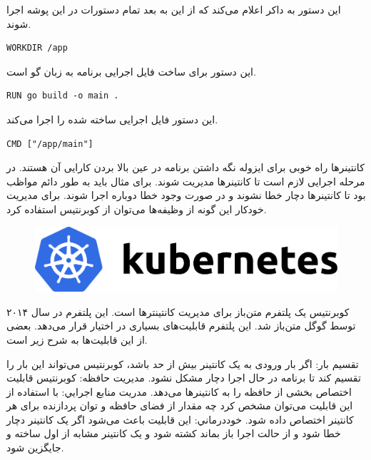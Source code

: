 \documentclass[a4]{report}
\begin{document}
این دستور به داکر اعلام می‌کند که از این به بعد تمام دستورات در این پوشه اجرا شوند.

\begin{latin}
\begin{verbatim}
WORKDIR /app
\end{verbatim}
\end{latin}

این دستور برای ساخت فایل اجرایی برنامه به زبان گو است.

\begin{latin}
\begin{verbatim}
RUN go build -o main .
\end{verbatim}
\end{latin}

این دستور فایل اجرایی ساخته شده را اجرا می‌کند.

\begin{latin}
\begin{verbatim}
CMD ["/app/main"]
\end{verbatim}
\end{latin}


کانتینرها راه خوبی برای ایزوله نگه داشتن برنامه در عین بالا بردن کارایی آن هستند. در مرحله اجرایی لازم است تا
کانتینر‌ها مدیریت شوند. برای مثال باید به طور دائم مواظب بود تا کانتینرها دچار خطا نشوند و در صورت وجود
خطا دوباره اجرا شوند. برای مدیریت خودکار این گونه از وظیفه‌ها می‌توان از کوبرنتیس استفاده کرد.

\begin{figure}
  \centering
  \includegraphics[scale=0.5]{fig/kubernetes}
\end{figure}

کوبرنتیس یک پلتفرم متن‌باز برای مدیریت کانتینتر‌ها است. این پلتفرم در سال ۲۰۱۴ توسط گوگل متن‌باز
شد. این پلتفرم قابلیت‌های بسیاری در اختیار قرار می‌دهد. بعضی از این قابلیت‌ها به شرح زیر است.

 تقسیم بار: اگر بار ورودی به یک کانتینر بیش از حد باشد، کوبرنتیس می‌تواند این بار را تقسیم کند
تا برنامه در حال اجرا دچار مشکل نشود.
 مدیریت حافظه: کوبرنتیس قابلیت اختصاص بخشی از حافظه را به کانتینر‌ها می‌دهد.
 مدریت منابع اجرایي: با استفاده از این قابلیت می‌توان مشخص کرد چه مقدار از فضای حافظه و توان پردازنده برای هر کانتینر اختصاص داده شود.
 خود‌درماني: این قابلیت باعث می‌شود اگر یک کانتینر دچار خطا شود و از حالت اجرا باز بماند کشته
شود و یک کانتینر مشابه از اول ساخته و جایگزین شود.
\end{document}
